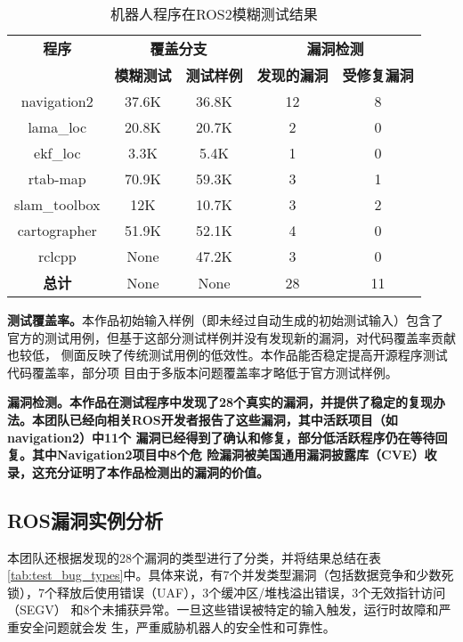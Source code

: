 \begin{table}[H]
	\small
	\caption{机器人程序在ROS2模糊测试结果}
  \label{tab:test_result}
	\centering
	\begin{tabular}{ccccc}
		\hline
		\textbf{程序} & \multicolumn{2}{c}{\textbf{覆盖分支}} & \multicolumn{2}{c}{\textbf{漏洞检测}} \\
		\cline{2-5}
		& \textbf{模糊测试} & \textbf{测试样例} & \textbf{发现的漏洞} & \textbf{受修复漏洞} \\
		\hline
		navigation2 & 37.6K & 36.8K & 12 & 8 \\
		lama\_loc & 20.8K & 20.7K & 2 & 0 \\
		ekf\_loc & 3.3K & 5.4K & 1 & 0 \\
		rtab-map & 70.9K & 59.3K & 3 & 1 \\
		slam\_toolbox & 12K & 10.7K & 3 & 2 \\
		cartographer & 51.9K & 52.1K & 4 & 0  \\
    rclcpp & None & 47.2K & 3 & 0 \\
		\textbf{总计} & None & None & 28 & 11 \\
		\hline
	\end{tabular}
\end{table}

\textbf{测试覆盖率。}本作品初始输入样例（即未经过自动生成的初始测试输入）包含了
官方的测试用例，但基于这部分测试样例并没有发现新的漏洞，对代码覆盖率贡献也较低，
侧面反映了传统测试用例的低效性。本作品能否稳定提高开源程序测试代码覆盖率，部分项
目由于多版本问题覆盖率才略低于官方测试样例。

\textbf{漏洞检测。本作品在测试程序中发现了28个真实的漏洞，并提供了稳定的复现办
法。本团队已经向相关ROS开发者报告了这些漏洞，其中活跃项目（如navigation2）中11个
漏洞已经得到了确认和修复，部分低活跃程序仍在等待回复。其中Navigation2项目中8个危
险漏洞被美国通用漏洞披露库（CVE）收录，这充分证明了本作品检测出的漏洞的价值。}

\subsection{ROS漏洞实例分析}


本团队还根据发现的28个漏洞的类型进行了分类，并将结果总结在表
\ref{tab:test_bug_types}中。具体来说，有7个并发类型漏洞（包括数据竞争和少数死
锁），7个释放后使用错误（UAF），3个缓冲区/堆栈溢出错误，3个无效指针访问（SEGV）
和8个未捕获异常。一旦这些错误被特定的输入触发，运行时故障和严重安全问题就会发
生，严重威胁机器人的安全性和可靠性。

